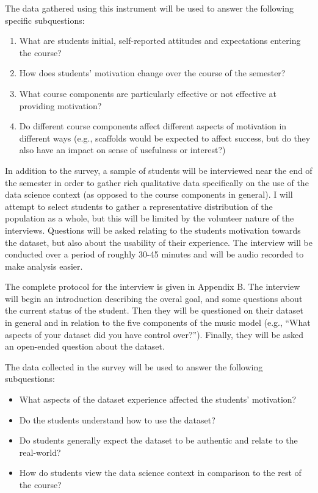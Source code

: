     The data gathered using this instrument will be used to answer the following specific subquestions:
    
    \begin{enumerate}
    \item What are students initial, self-reported attitudes and expectations entering the course?
    \item How does students' motivation change over the course of the semester?
    \item What course components are particularly effective or not effective at providing motivation?
    \item Do different course components affect different aspects of motivation in different ways (e.g., scaffolds would be expected to affect success, but do they also have an impact on sense of usefulness or interest?)
    \end{enumerate}
    
	In addition to the survey, a sample of students will be interviewed near the end of the semester in order to gather rich qualitative data specifically on the use of the data science context (as opposed to the course components in general).
    I will attempt to select students to gather a representative distribution of the population as a whole, but this will be limited by the volunteer nature of the interviews.
    Questions will be asked relating to the students motivation towards the dataset, but also about the usability of their experience.
    The interview will be conducted over a period of roughly 30-45 minutes and will be audio recorded to make analysis easier.
    
    The complete protocol for the interview is given in Appendix B. The interview will begin an introduction describing the overal goal, and some questions about the current status of the student. Then they will be questioned on their dataset in general and in relation to the five components of the music model (e.g., ``What aspects of your dataset did you have control over?''). Finally, they will be asked an open-ended question about the dataset.
    
    The data collected in the survey will be used to answer the following subquestions:
    
    \begin{itemize}
    \item What aspects of the dataset experience affected the students' motivation?
    \item Do the students understand how to use the dataset?
    \item Do students generally expect the dataset to be authentic and relate to the real-world?
    \item How do students view the data science context in comparison to the rest of the course?
    \end{itemize}
                
